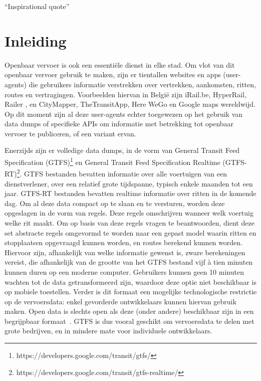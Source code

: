 \begin{savequote}[0.55\linewidth]
	``Inspirational quote''
\end{savequote}

\chapter{Inleiding}
\label{chap:intro}
Openbaar vervoer is ook een essentiële dienst in elke stad\citep{programmableweb14}. Om vlot van dit openbaar vervoer gebruik te maken, zijn er tientallen websites en apps (user-agents) die gebruikers informatie verstrekken over vertrekken, aankomsten, ritten, routes en vertragingen. Voorbeelden hiervan in België zijn iRail.be, HyperRail, Railer , en CityMapper, TheTransitApp, Here WeGo en Google maps wereldwijd. Op dit moment zijn al deze user-agents echter toegewezen op het gebruik van data dumps of specifieke APIs om informatie met betrekking tot openbaar vervoer te publiceren, of een variant ervan. 

Enerzijds zijn er volledige data dumps, in de vorm van General Transit Feed Specification (GTFS)\footnote{https://developers.google.com/transit/gtfs/} en General Transit Feed Specification Realtime (GTFS-RT)\footnote{https://developers.google.com/transit/gtfs-realtime/}. GTFS bestanden bevatten informatie over alle voertuigen van een dienstverlener, over een relatief grote tijdspanne, typisch enkele maanden tot een jaar. GTFS-RT bestanden bevatten realtime informatie over ritten in de komende dag. Om al deze data compact op te slaan en te versturen, worden deze opgeslagen in de vorm van regels. Deze regels omschrijven wanneer welk voertuig welke rit maakt. Om op basis van deze regels vragen te beantwoorden, dient deze set abstracte regels omgevormd te worden naar een gepast model waarin ritten en stopplaatsen opgevraagd kunnen worden, en routes berekend kunnen worden. Hiervoor zijn, afhankelijk van welke informatie gewenst is, zware berekeningen vereist, die afhankelijk van de grootte van het GTFS bestand vijf à tien minuten kunnen duren op een moderne computer. Gebruikers kunnen geen 10 minuten wachten tot de data getransformeerd zijn, waardoor deze optie niet beschikbaar is op mobiele toestellen. Verder is dit formaat een mogelijke technologische restrictie op de vervoersdata: enkel gevorderde ontwikkelaars kunnen hiervan gebruik maken. Open data is slechts open als deze (onder andere) beschikbaar zijn in een begrijpbaar formaat~\citep{okfn18}. GTFS is dus vooral geschikt om vervoersdata te delen met grote bedrijven, en in mindere mate voor individuele ontwikkelaars.

